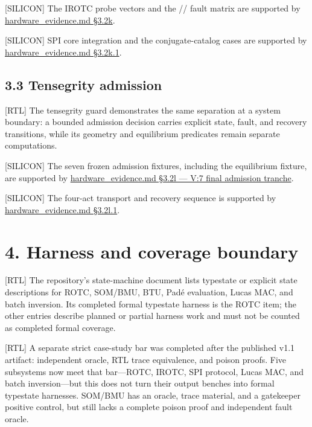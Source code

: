 \documentclass[11pt]{article}
\begin{document}
[SILICON] The IROTC probe vectors and the // fault matrix are supported by \href{https://github.com/pinnacletechnologysolutionsltd/SPU/blob/v1.2-typestate/docs/hardware_evidence.md#32k-irotc-icosahedral-rotation-engine-silicon-probe}{hardware\_evidence.md §3.2k}.

[SILICON] SPI core integration and the conjugate-catalog cases are supported by \href{https://github.com/pinnacletechnologysolutionsltd/SPU/blob/v1.2-typestate/docs/hardware_evidence.md#32k1-irotc-spi-core-integration--conjugate-catalog-silicon-proof}{hardware\_evidence.md §3.2k.1}.

\subsection{3.3 Tensegrity admission}

[RTL] The tensegrity guard demonstrates the same separation at a system boundary: a bounded admission decision carries explicit state, fault, and recovery transitions, while its geometry and equilibrium predicates remain separate computations.

[SILICON] The seven frozen admission fixtures, including the equilibrium fixture, are supported by \href{https://github.com/pinnacletechnologysolutionsltd/SPU/blob/v1.2-typestate/docs/hardware_evidence.md#32l-wukong-tensegrity-admission-guard-silicon-probe}{hardware\_evidence.md §3.2l — V:7 final admission tranche}.

[SILICON] The four-act transport and recovery sequence is supported by \href{https://github.com/pinnacletechnologysolutionsltd/SPU/blob/v1.2-typestate/docs/hardware_evidence.md#32l1-tensegritylink-four-act-proof-on-the-karatsuba-candidate}{hardware\_evidence.md §3.2l.1}.

\section{4. Harness and coverage boundary}

[RTL] The repository's state-machine document lists typestate or explicit state descriptions for ROTC, SOM/BMU, BTU, Padé evaluation, Lucas MAC, and batch inversion. Its completed formal typestate harness is the ROTC item; the other entries describe planned or partial harness work and must not be counted as completed formal coverage.

[RTL] A separate strict case-study bar was completed after the published v1.1 artifact: independent oracle, RTL trace equivalence, and poison proofs. Five subsystems now meet that bar---ROTC, IROTC, SPI protocol, Lucas MAC, and batch inversion---but this does not turn their output benches into formal typestate harnesses. SOM/BMU has an oracle, trace material, and a gatekeeper positive control, but still lacks a complete poison proof and independent fault oracle.
\end{document}
